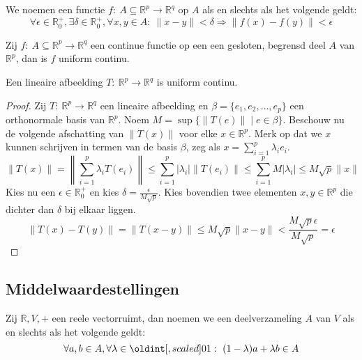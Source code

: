 \documentclass[main.tex]{subfiles}
\begin{document}
\begin{de}
  We noemen een functie $f:\ A \subseteq \mathbb{R}^{p} \rightarrow \mathbb{R}^{q}$  op $A$ als en slechts als het volgende geldt:
  \[ \forall \epsilon \in \mathbb{R}_{0}^{+}, \exists \delta \in \mathbb{R}_{0}^{+}, \forall x,y \in A:\ \|x-y\| < \delta \Rightarrow \|f(x)-f(y)\| < \epsilon \]
\end{de}

\begin{st}
  Zij $f:\ A \subseteq \mathbb{R}^{p} \rightarrow \mathbb{R}^{q}$ een continue functie op een een gesloten, begrensd deel $A$ van $\mathbb{R}^{p}$, dan is $f$ uniform continu.
\end{st}

\begin{st}
  Een lineaire afbeelding $T:\ \mathbb{R}^{p}\rightarrow \mathbb{R}^{q}$ is uniform continu.

  \begin{proof}
    Zij $T:\ \mathbb{R}^{p}\rightarrow \mathbb{R}^{q}$ een lineaire afbeelding en $\beta = \{e_{1},e_{2},\dotsc,e_{p}\}$ een orthonormale basis van $\mathbb{R}^{p}$.
    Noem $M = \sup\{\|T(e)\| \mid e \in \beta \}$.
    Beschouw nu de volgende afschatting van $\|T(x)\|$ voor elke $x\in \mathbb{R}^{p}$.
    Merk op dat we $x$ kunnen schrijven in termen van de basis $\beta$, zeg als $x = \sum_{i=1}^{p}\lambda_{i}e_{i}$.
    \[
    \|T(x)\|
    = \left\| \sum_{i=1}^{p}\lambda_{i}T(e_{i}) \right\|
    \le \sum_{i=1}^{p} |\lambda_{i}|\|T(e_{i})\|
    \le \sum_{i=1}^{p} M |\lambda_{i}|
    \le M \sqrt{p} \|x\|
    \]
    Kies nu een $\epsilon \in \mathbb{R}_{0}^{+}$ en kies $\delta = \frac{\epsilon}{M\sqrt{p}}$.
    Kies bovendien twee elementen $x,y\in \mathbb{R}^{p}$ die dichter dan $\delta$ bij elkaar liggen.
    \[ \|T(x)-T(y)\| = \|T(x-y)\| \le M\sqrt{p}\|x-y\| < \frac{M \sqrt{p}\epsilon}{M\sqrt{p}} = \epsilon \]
  \end{proof}
\feed
\end{st}


\subsection{Middelwaardestellingen}

\begin{de}
  Zij $\mathbb{R},V,+$ een reele vectorruimt, dan noemen we een deelverzameling $A$ van $V$  als en slechts als het volgende geldt:
  \[ \forall a,b \in A, \forall \lambda \in \interval{0}{1}:\ (1-\lambda)a+\lambda b \in A \]
\end{de}
\end{document}
